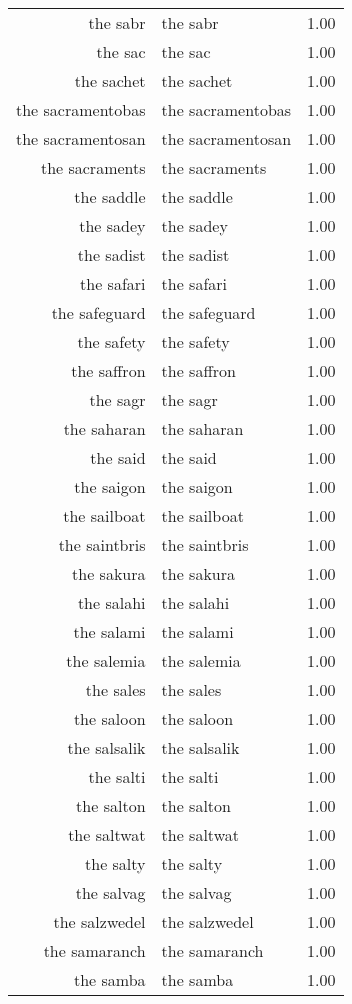 \begin{table}[ht]
\begin{tabular}{rlr}
  the sabr & the sabr & 1.00 \\ 
  the sac & the sac & 1.00 \\ 
  the sachet & the sachet & 1.00 \\ 
  the sacramentobas & the sacramentobas & 1.00 \\ 
  the sacramentosan & the sacramentosan & 1.00 \\ 
  the sacraments & the sacraments & 1.00 \\ 
  the saddle & the saddle & 1.00 \\ 
  the sadey & the sadey & 1.00 \\ 
  the sadist & the sadist & 1.00 \\ 
  the safari & the safari & 1.00 \\ 
  the safeguard & the safeguard & 1.00 \\ 
  the safety & the safety & 1.00 \\ 
  the saffron & the saffron & 1.00 \\ 
  the sagr & the sagr & 1.00 \\ 
  the saharan & the saharan & 1.00 \\ 
  the said & the said & 1.00 \\ 
  the saigon & the saigon & 1.00 \\ 
  the sailboat & the sailboat & 1.00 \\ 
  the saintbris & the saintbris & 1.00 \\ 
  the sakura & the sakura & 1.00 \\ 
  the salahi & the salahi & 1.00 \\ 
  the salami & the salami & 1.00 \\ 
  the salemia & the salemia & 1.00 \\ 
  the sales & the sales & 1.00 \\ 
  the saloon & the saloon & 1.00 \\ 
  the salsalik & the salsalik & 1.00 \\ 
  the salti & the salti & 1.00 \\ 
  the salton & the salton & 1.00 \\ 
  the saltwat & the saltwat & 1.00 \\ 
  the salty & the salty & 1.00 \\ 
  the salvag & the salvag & 1.00 \\ 
  the salzwedel & the salzwedel & 1.00 \\ 
  the samaranch & the samaranch & 1.00 \\ 
  the samba & the samba & 1.00 \\ 

\end{tabular}
\end{table}
